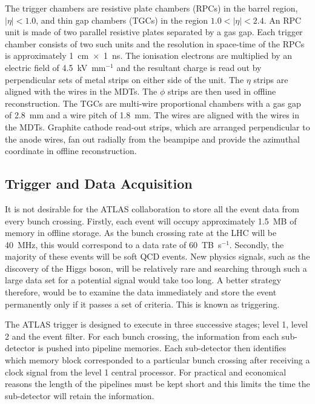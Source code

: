 The trigger chambers are resistive plate chambers (RPCs) in the barrel region, $|\eta|<1.0$, and thin gap chambers (TGCs) in the region $1.0<|\eta|<2.4$. An RPC unit is made of two parallel resistive plates separated by a gas gap. Each trigger chamber consists of two such units and the resolution in space-time of the RPCs is approximately 1~cm~$\times$~1~ns. The ionisation electrons are multiplied by an electric field of 4.5~kV~mm$^{-1}$ and the resultant charge is read out by perpendicular sets of metal strips on either side of the unit. The $\eta$ strips are aligned with the wires in the MDTs. The $\phi$ strips are then used in offline reconstruction. The TGCs are multi-wire proportional chambers with a gas gap of 2.8~mm and a wire pitch of 1.8~mm. The wires are aligned with the wires in the MDTs. Graphite cathode read-out strips, which are arranged perpendicular to the anode wires, fan out radially from the beampipe and provide the azimuthal coordinate in offline reconstruction. 

\subsection{Trigger and Data Acquisition} \label{triggers}

It is not desirable for the ATLAS collaboration to store all the event data from every bunch crossing. Firstly, each event will occupy approximately 1.5~MB of memory in offline storage. As the bunch crossing rate at the LHC will be 40~MHz, this would correspond to a data rate of 60~TB~s$^{-1}$. Secondly, the majority of these events will be soft QCD events. New physics signals, such as the discovery of the Higgs boson, will be relatively rare and searching through such a large data set for a potential signal would take too long. A better strategy therefore, would be to examine the data immediately and store the event permanently only if it passes a set of criteria. This is known as triggering.

The ATLAS trigger \cite{:1999fq:Chapter1,:1999fq:Chapter11} is designed to execute in three successive stages; level 1, level 2 and the event filter. 
For each bunch crossing, the information from each sub-detector is pushed into pipeline memories. Each sub-detector then identifies which memory block corresponded to a particular bunch crossing after receiving a clock signal from the level 1 central processor. For practical and economical reasons the length of the pipelines must be kept short and this limits the time the sub-detector will retain the information.

